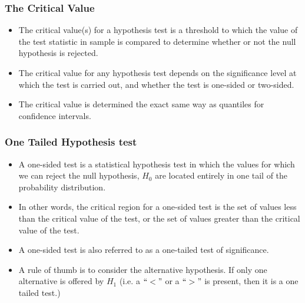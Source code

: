 

\begin{frame}
\frametitle{The Critical Value}


\begin{itemize}
\item The critical value(s) for a hypothesis test is a threshold to which the value of the test statistic in sample is compared to determine whether or not the null hypothesis is rejected.
\item The critical value for any hypothesis test depends on the significance level at which the test is carried out, and whether the test is one-sided or two-sided.
\item The critical value is determined the exact same way as quantiles for confidence intervals.

\end{itemize}
\end{frame}



\begin{frame}
\frametitle{One Tailed Hypothesis test}
\begin{itemize}
\item A one-sided test is a statistical hypothesis test in which the values for which we can reject the null hypothesis, $H_0$ are located entirely in one tail of the probability distribution.

\item In other words, the critical region for a one-sided test is the set of values less than the critical value of the test, or the set of values greater than the critical value of the test.

\item A one-sided test is also referred to as a one-tailed test of significance.

\item A rule of thumb is to consider the alternative hypothesis.  If only one alternative is offered by $H_1$ (i.e. a $``<"$ or a $``>"$ is present, then it is a one tailed test.)

\end{itemize}
\end{frame}


